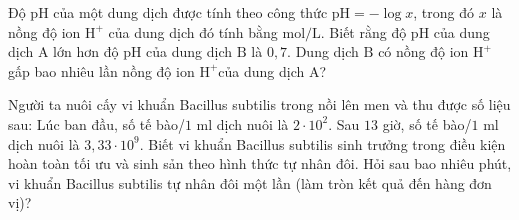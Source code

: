 \begin{bt}
	Độ $\mathrm{pH}$ của một dung dịch được tính theo công thức $\mathrm{pH}=-\log x$, trong đó $x$ là nồng độ ion $\mathrm{H}^+$ của dung dịch đó tính bằng $\mathrm{mol}/ \mathrm{L}$. Biết rằng độ $\mathrm{pH}$ của dung dịch $\mathrm{A}$ lớn hơn độ $\mathrm{pH}$ của dung dịch $\mathrm{B}$ là $0{,}7$. Dung dịch $\mathrm{B}$ có nồng độ ion $\mathrm{H}^+$ gấp bao nhiêu lần nồng độ ion $\mathrm{H}^+$của dung dịch $\mathrm{A}$?
\end{bt}

\begin{bt}
	Người ta nuôi cấy vi khuẩn Bacillus subtilis trong nồi lên men và thu được số liệu sau: Lúc ban đầu, số tế bào/$1$ ml dịch nuôi là $2\cdot10^2$. Sau $13$ giờ, số tế bào/$1$ ml dịch nuôi là $3{,}33\cdot10^9$. Biết vi khuẩn Bacillus subtilis sinh trưởng trong điều kiện hoàn toàn tối ưu và sinh sản theo hình thức tự nhân đôi. Hỏi sau bao nhiêu phút, vi khuẩn Bacillus subtilis tự nhân đôi một lần (làm tròn kết quả đến hàng đơn vị)?
\end{bt}

